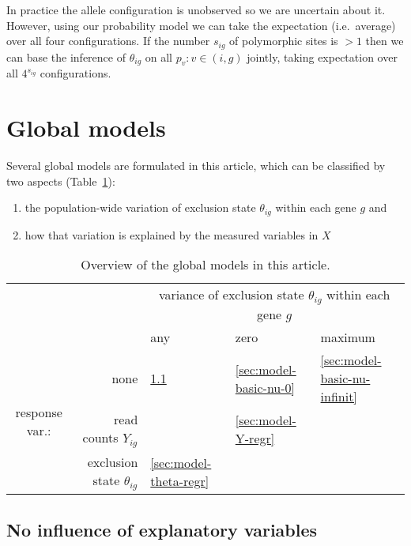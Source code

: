 \documentclass[letterpaper]{article}
\begin{document}
In practice the allele configuration is unobserved so we are uncertain about
it.  However, using our probability model we can take the expectation
(i.e.~average) over all four configurations.  If the number \(s_{ig}\) of
polymorphic sites is \(>1\) then we can base the inference of \(\theta_{ig}\)
on all \(p_v: v\in(i,g)\) jointly, taking expectation over all \(4^{s_{ig}}\)
configurations.

\section{Global models}
\label{sec:models}

Several global models are formulated in this article, which can be classified
by two aspects (Table~\ref{tab:model-overview}):
\begin{enumerate}
\item
the population-wide variation
of exclusion state \(\theta_{ig}\) within each gene \(g\) and
\item how that variation is explained by the measured variables in \(X\)
\end{enumerate}

\begin{table}[b]
\begin{tabular}{cr|p{2.2 cm}p{2.2 cm}p{2.2 cm}|}
& & \multicolumn{3}{c|}{ variance of exclusion state \(\theta_{ig}\) within each gene \(g\) } \\
& & any & zero & maximum  \\
\hline
\multirow{3}{*}{response var.:} & none & \ref{sec:model-basic} & \ref{sec:model-basic-nu-0} & \ref{sec:model-basic-nu-infinit} \\
& read counts
\(Y_{ig}\) & & \ref{sec:model-Y-regr} & \\
& exclusion state \(\theta_{ig}\) & \ref{sec:model-theta-regr} & & \\
\hline
\end{tabular}
\caption{
Overview of the global models in this article.
}
\label{tab:model-overview}
\end{table}

\renewcommand{\thesubsection}{M\arabic{model}}

\subsection{No influence of explanatory variables }
\label{sec:model-basic}
\end{document}
